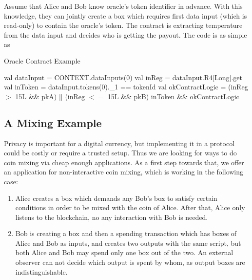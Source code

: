  Assume that Alice and Bob know oracle's token identifier in advance. With this knowledge, they
 can jointly create a box which requires first data input (which is read-only) to contain the oracle's token. The
 contract is extracting temperature from the data input and decides who is getting the payout. The code is as simple as


 \begin{algorithm}[H]
    \caption{Oracle Contract Example}
    \label{alg:oracle}
    \begin{algorithmic}[1]
        \State val dataInput = CONTEXT.dataInputs(0)
        \State val inReg = dataInput.R4[Long].get
        \State val inToken = dataInput.tokens(0).\_1 == tokenId
        \State val okContractLogic = (inReg $>$ 15L \&\& pkA) $||$ (inReg $<=$ 15L \&\& pkB)
        \State inToken \&\& okContractLogic
    \end{algorithmic}
 \end{algorithm}


\subsection{A Mixing Example}
 \label{sec:platform}

 Privacy is important for a digital currency, but implementing it in a protocol could be costly or require a trusted
 setup. Thus we are looking for ways to do coin mixing via cheap enough applications. As a first step towards that, we
 offer an application for non-interactive coin mixing, which is working in the following case:
 \begin{enumerate}
    \item{} Alice creates a box which demands any Bob's box to satisfy certain conditions in order to be mixed with
    the coin of Alice. After that, Alice only listens to the blockchain, no any interaction with Bob is needed.
    \item{} Bob is creating a box and then a spending transaction which has boxes of Alice and Bob as inputs,
     and creates two outputs with the same script, but both Alice and Bob may spend only one box out of the two.
     An external observer can not decide which output is spent by whom, as output boxes are indistinguishable.
 \end{enumerate}

